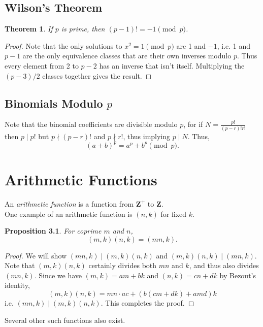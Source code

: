 \documentclass{amsbook}
\numberwithin{section}{chapter}
\theoremstyle{plain}
\newtheorem{thm}{Theorem}[section]
\newtheorem{prop}[thm]{Proposition}
\theoremstyle{definition}
\def\br{~\\[1em]}
\def\ZZ{\mathbf Z}
\begin{document}
\section{Wilson's Theorem}
\begin{thm}
If $p$ is prime, then $(p - 1)! = -1\pmod p$.
\end{thm}
\begin{proof}
Note that the only solutions to $x^2 = 1\pmod p$ are 1 and $-1$,
i.e. 1 and $p-1$ are the only equivalence classes
that are their own inverses modulo $p$. Thus
every element from 2 to $p - 2$ has an inverse that isn't itself.
Multiplying the $(p - 3)/2$ classes together gives the result.
\end{proof}
\section{Binomials Modulo $p$}
Note that the binomial coefficients are divisible modulo $p$, for if 
$N = \frac{p!}{(p-r)!r!}$ then $p\mid p!$ but
$p\nmid (p-r)!$ and $p\nmid r!$, thus implying $p\mid N$.
Thus,
\[(a + b)^p = a^p + b^p\pmod p.\]
\chapter{Arithmetic Functions}
An \textit{arithmetic function} is a function from $\ZZ^+$ to $\ZZ$.
\br
One example of an arithmetic function is $(n, k)$ for fixed $k$.
\begin{prop}
For coprime $m$ and $n$,
\[(m, k)(n, k) = (mn, k).\]
\end{prop}
\begin{proof}
We will show $(mn, k)\mid (m, k)(n, k)$ and $(m, k)(n, k)\mid(mn, k)$.
Note that $(m, k)(n, k)$ certainly divides both $mn$ and $k$,
and thus also divides $(mn, k)$. Since we have $(m, k) = am + bk$ and
$(n, k) = cn + dk$ by Bezout's identity,
\[(m, k)(n, k) = mn\cdot ac + (b(cm + dk) + amd)k\]
i.e. $(mn, k)\mid(m, k)(n, k)$. This completes the proof.
\end{proof}
Several other such functions also exist.
\end{document}
